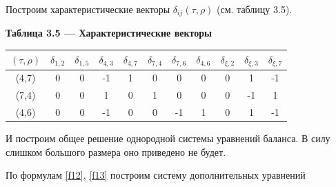 \documentclass[14pt]{extarticle}%
\begin{document}
Построим характеристические векторы $\delta_{ij}(\tau,\rho)$ (см. таблицу 3.5).

\begin{center}
\textbf{Таблица 3.5 --- Характеристические векторы }\\
\begin{tabular}{c|cccccccccc}
 $(\tau,\rho)$& $\delta _{1,2}$ & $\delta _{1,5}$ & $\delta _{4,3}$ & $\delta _{4,7}$ & $\delta _{7,4}$ & $\delta _{7,6}$ & $\delta _{4,6}$ & $\delta _{\xi,2}$ & $\delta _{\xi,3}$ & $\delta _{\xi,7}$ \\\hline
 (4,7)&0 & 0 & -1 & 1 & 0 & 0 & 0 & 0 & 1 & -1 \\
 (7,4)&0 & 0 & 1 & 0 & 1 & 0 & 0 & 0 & -1 & 1  \\
 (4,6)& 0 & 0 & -1 & 0 & 0 & -1 & 1 & 0 & 1 & -1 
\end{tabular}
\end{center}

И построим общее решение однородной системы уравнений баланса. В силу слишком большого размера оно приведено не будет.

По формулам \eqref{f12}, \eqref{f13} построим систему дополнительных уравнений
\end{document}
